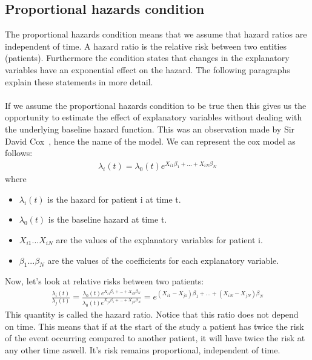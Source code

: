 \subsection{Proportional hazards condition}
The proportional hazards condition means that we assume that hazard ratios are independent of time. A hazard ratio is the relative risk between two entities (patients). Furthermore the condition states that changes in the explanatory variables have an exponential effect on the hazard. The following paragraphs explain these statements in more detail.\\ \\
If we assume the proportional hazards condition to be true then this gives us the opportunity to estimate the effect of explanatory variables without dealing with the underlying baseline hazard function. This was an observation made by Sir David Cox~\cite{cox1972life}, hence the name of the model. We can represent the cox model as follows:
\begin{equation}
\begin{split}
\lambda_{i}(t) = \lambda_{0}(t)e^{X_{i1}\beta_{1} + ... + X_{iN}\beta_{N}}
\end{split}
\end{equation}
where
\begin{itemize}
	\item $\lambda_{i}(t)$ is the hazard for patient i at time t.
	\item $\lambda_{0}(t)$ is the baseline hazard at time t.
	\item $X_{i1} ... X_{iN}$ are the values of the explanatory variables for patient i.
	\item $\beta_{1} ... \beta_{N}$ are the values of the coefficients for each explanatory variable.
\end{itemize}
Now, let's look at relative risks between two patients:
\begin{equation}
\begin{split}
\frac{\lambda_{i}(t)}{\lambda_{j}(t)} 
= \frac{\lambda_{0}(t)e^{X_{i1}\beta_{1} + ... + X_{iN}\beta_{N}}}{\lambda_{0}(t)e^{X_{j1}\beta_{1} + ... + X_{jN}\beta_{N}}}
= e^{(X_{i1}-X_{j1})\beta_{1} + ... + (X_{iN}-X_{jN})\beta_{N}}
\end{split}
\end{equation}
This quantity is called the hazard ratio. Notice that this ratio does not depend on time. This means that if at the start of the study a patient has twice the risk of the event occurring compared to another patient, it will have twice the risk at any other time aswell. It's risk remains proportional, independent of time. \\ \\

